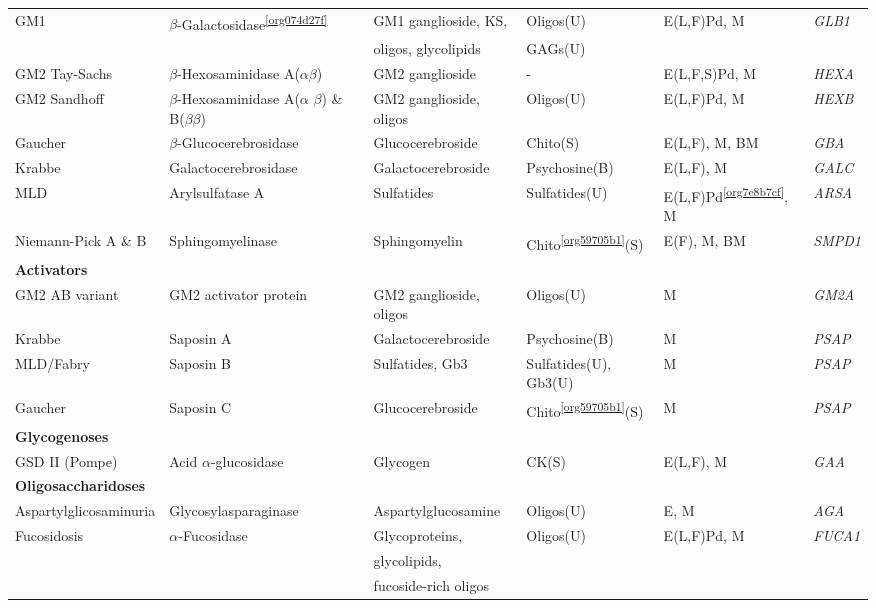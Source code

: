 \documentclass[landscape]{article}
\begin{document}
\begin{longtable}{llllll}
GM1 & \(\beta\)-Galactosidase\textsuperscript{\ref{org074d27f}} & GM1 ganglioside, KS, & Oligos(U) & E(L,F)Pd, M & \emph{GLB1}\\
 &  & oligos, glycolipids & GAGs(U) &  & \\
GM2 Tay-Sachs & \(\beta\)-Hexosaminidase A(\sout{\(\alpha\)}\(\beta\)) & GM2 ganglioside & - & E(L,F,S)Pd\footnotemark, M & \emph{HEXA}\\
GM2 Sandhoff & \(\beta\)-Hexosaminidase A(\(\alpha\) \sout{\(\beta\)}) \& B(\sout{\(\beta \beta\)}) & GM2 ganglioside, oligos & Oligos(U) & E(L,F)Pd, M & \emph{HEXB}\\
Gaucher & \(\beta\)-Glucocerebrosidase & Glucocerebroside & Chito\footnotemark(S) & E(L,F), M, BM & \emph{GBA}\\
Krabbe & Galactocerebrosidase & Galactocerebroside & Psychosine(B) & E(L,F), M & \emph{GALC}\\
MLD & Arylsulfatase A & Sulfatides & Sulfatides(U) & E(L,F)Pd\textsuperscript{\ref{org7e8b7cf}}, M & \emph{ARSA}\\
Niemann-Pick A \& B & Sphingomyelinase & Sphingomyelin & Chito\textsuperscript{\ref{org59705b1}}(S) & E(F), M, BM & \emph{SMPD1}\\
\hline
\textbf{Activators} &  &  &  &  & \\
GM2 AB variant & GM2 activator protein & GM2 ganglioside, oligos & Oligos(U) & M & \emph{GM2A}\\
Krabbe & Saposin A & Galactocerebroside & Psychosine(B) & M & \emph{PSAP}\\
MLD/Fabry & Saposin B & Sulfatides, Gb3 & Sulfatides(U), Gb3(U) & M & \emph{PSAP}\\
Gaucher & Saposin C & Glucocerebroside & Chito\textsuperscript{\ref{org59705b1}}(S) & M & \emph{PSAP}\\
\hline
\textbf{Glycogenoses} &  &  &  &  & \\
GSD II (Pompe) & Acid \(\alpha\)-glucosidase & Glycogen & CK(S) & E(L\footnotemark,F), M & \emph{GAA}\\
\hline
\textbf{Oligosaccharidoses} &  &  &  &  & \\
Aspartylglicosaminuria & Glycosylasparaginase & Aspartylglucosamine & Oligos(U) & E, M & \emph{AGA}\\
Fucosidosis & \(\alpha\)-Fucosidase & Glycoproteins, & Oligos(U) & E(L,F)Pd, M & \emph{FUCA1}\\
 &  & glycolipids, &  &  & \\
 &  & fucoside-rich oligos &  &  & \\

\end{longtable}
\end{document}
